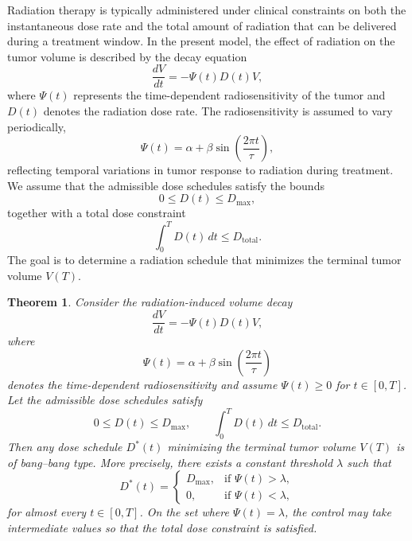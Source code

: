 \documentclass[11pt, reqno]{amsart}
\numberwithin{equation}{section}
\newtheorem{theorem}{Theorem}[section]
\theoremstyle{definition}
\begin{document}
Radiation therapy is typically administered under clinical constraints on both the instantaneous dose rate and the total amount of radiation that can be delivered during a treatment window. In the present model, the effect of radiation on the tumor volume is described by the decay equation
\[
\frac{dV}{dt} = -\Psi(t)D(t)V,
\]
where $\Psi(t)$ represents the time-dependent radiosensitivity of the tumor and $D(t)$ denotes the radiation dose rate. The radiosensitivity is assumed to vary periodically,
\[
\Psi(t) = \alpha + \beta \sin\!\left(\frac{2\pi t}{\tau}\right),
\]
reflecting temporal variations in tumor response to radiation during treatment. We assume that the admissible dose schedules satisfy the bounds
\[
0 \le D(t) \le D_{\max},
\]
together with a total dose constraint
\[
\int_0^T D(t)\,dt \le D_{\mathrm{total}}.
\]
The goal is to determine a radiation schedule that minimizes the terminal tumor volume $V(T)$.

 \begin{theorem}\label{thm:rt}
Consider the radiation-induced volume decay
\[
\frac{dV}{dt} = -\Psi(t)D(t)V,
\]
where
\[
\Psi(t) = \alpha + \beta \sin\!\left(\frac{2\pi t}{\tau}\right)
\]
denotes the time-dependent radiosensitivity and assume $\Psi(t)\ge0$ for $t\in[0,T]$. Let the admissible dose schedules satisfy
\[
0 \le D(t) \le D_{\max}, 
\qquad 
\int_0^T D(t)\,dt \le D_{\mathrm{total}}.
\]
Then any dose schedule $D^*(t)$ minimizing the terminal tumor volume $V(T)$ is of bang--bang type. More precisely, there exists a constant threshold $\lambda$ such that
\[
D^*(t) =
\begin{cases}
D_{\max}, & \text{if } \Psi(t) > \lambda,\\[2mm]
0, & \text{if } \Psi(t) < \lambda,
\end{cases}
\]
for almost every $t\in[0,T]$. On the set where $\Psi(t)=\lambda$, the control may take intermediate values so that the total dose
constraint is satisfied.
\end{theorem}
\end{document}
